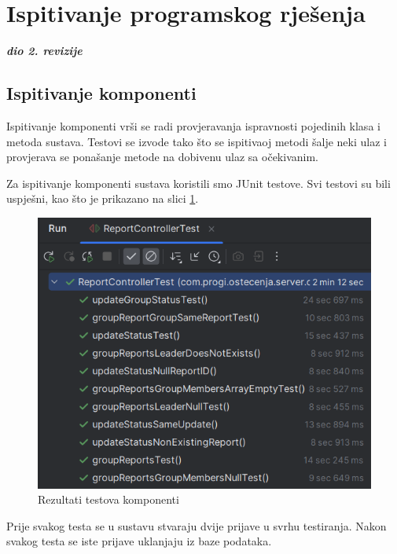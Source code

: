 			\eject 
		
	
		\section{Ispitivanje programskog rješenja}
			
			\textbf{\textit{dio 2. revizije}}\\
			
			\subsection{Ispitivanje komponenti}
			
			Ispitivanje komponenti vrši se radi provjeravanja ispravnosti pojedinih klasa i metoda sustava. Testovi se izvode tako što se ispitivaoj metodi šalje neki ulaz i provjerava se ponašanje metode na dobivenu ulaz sa očekivanim.
			
			Za ispitivanje komponenti sustava koristili smo JUnit testove. Svi testovi su bili uspješni, kao što je prikazano na slici \ref{fig:JUnitTestovi}.
			
			\begin{figure}[H]
				\includegraphics[width=\textwidth]{slike/JUnitTestoviRez.png} %
				\caption{Rezultati testova komponenti}
				\label{fig:JUnitTestovi} %
			\end{figure}
			
			Prije svakog testa se u sustavu stvaraju dvije prijave u svrhu testiranja. Nakon svakog testa se iste prijave uklanjaju iz baze podataka.
			
